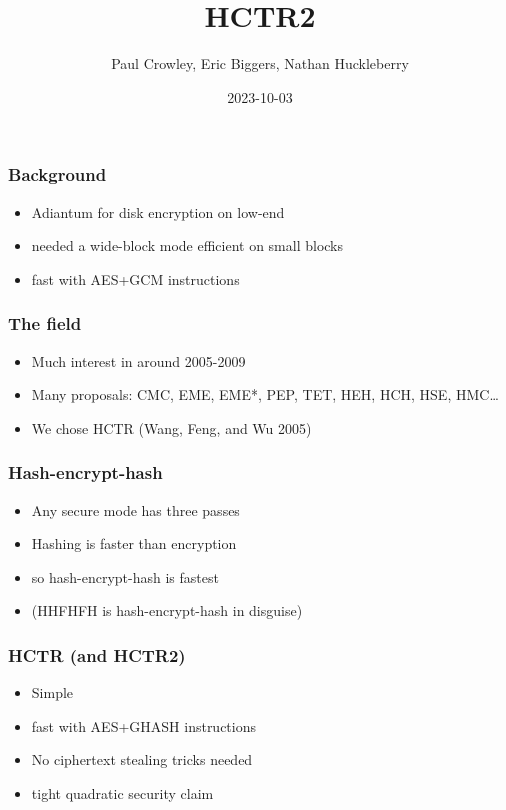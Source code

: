 \documentclass{beamer}
\title{HCTR2}
\author{Paul Crowley, Eric Biggers, Nathan Huckleberry}
\institute{Google LLC}
\date{2023-10-03}
\begin{document}
\frame{\titlepage}

\begin{frame}

\frametitle{Background}

\begin{itemize}
    \item Adiantum for disk encryption on low-end
    \item needed a wide-block mode efficient on small blocks
    \item fast with AES+GCM instructions
\end{itemize}
\end{frame}

\begin{frame}

\frametitle{The field}

\begin{itemize}
    \item Much interest in around 2005-2009
    \item Many proposals: CMC, EME, EME*, PEP, TET, HEH, HCH, HSE, HMC…
    \item We chose HCTR (Wang, Feng, and Wu 2005)
\end{itemize}
\end{frame}

\begin{frame}

\frametitle{Hash-encrypt-hash}

\begin{itemize}
    \item Any secure mode has three passes
    \item Hashing is faster than encryption
    \item so hash-encrypt-hash is fastest
    \item (HHFHFH is hash-encrypt-hash in disguise)
\end{itemize}
\end{frame}

\begin{frame}

\frametitle{HCTR (and HCTR2)}

\begin{itemize}
    \item Simple
    \item fast with AES+GHASH instructions
    \item No ciphertext stealing tricks needed
    \item tight quadratic security claim
\end{itemize}
\end{frame}
\end{document}
